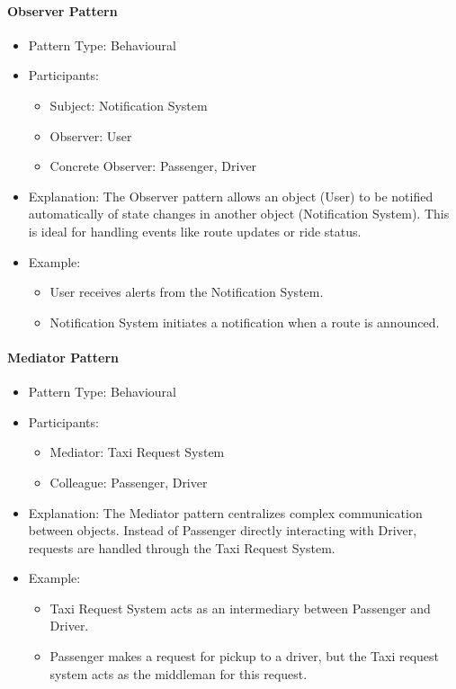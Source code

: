 \documentclass[a4paper,12pt]{article}
\begin{document}
\paragraph{Observer Pattern}
\begin{itemize}
    \item Pattern Type: Behavioural
    \item Participants:
    \begin{itemize}
        \item Subject: Notification System
        \item Observer: User
        \item Concrete Observer: Passenger, Driver 
    \end{itemize}
    \item Explanation: The Observer pattern allows an object (User) to be notified automatically of state changes in another object (Notification System). This is ideal for handling events like route updates or ride status.
    \item Example:
    \begin{itemize}
        \item User receives alerts from the Notification System.
        \item Notification System initiates a notification when a route is announced.
    \end{itemize}
\end{itemize}

\paragraph{Mediator Pattern}
\begin{itemize}
    \item Pattern Type: Behavioural
    \item Participants:
    \begin{itemize}
        \item Mediator: Taxi Request System
        \item Colleague: Passenger, Driver
    \end{itemize}
    \item Explanation: The Mediator pattern centralizes complex communication between objects. Instead of Passenger directly interacting with Driver, requests are handled through the Taxi Request System.
    \item Example:
    \begin{itemize}
        \item Taxi Request System acts as an intermediary between Passenger and Driver.
        \item Passenger makes a request for pickup to a driver, but the Taxi request system acts as the middleman for this request.
    \end{itemize}
\end{itemize}
\end{document}
